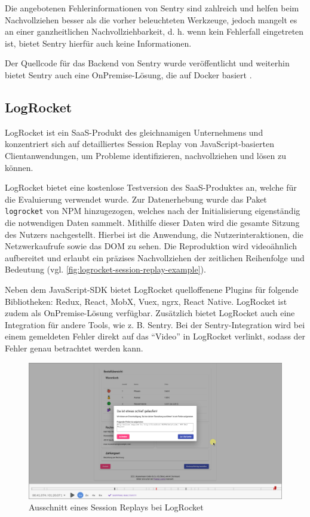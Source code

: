 Die angebotenen Fehlerinformationen von Sentry sind zahlreich und helfen beim Nachvollziehen besser als die vorher beleuchteten Werkzeuge, jedoch mangelt es an einer ganzheitlichen Nachvollziehbarkeit, d. h. wenn kein Fehlerfall eingetreten ist, bietet Sentry hierfür auch keine Informationen.

Der Quellcode für das Backend von Sentry wurde veröffentlicht und weiterhin bietet Sentry auch eine OnPremise-Lösung, die auf Docker basiert \cite{SentrySelfHosted}.

\subsection{LogRocket}

LogRocket \cite{LogRocket} ist ein SaaS-Produkt des gleichnamigen Unternehmens und konzentriert sich auf detailliertes Session Replay von JavaScript-basierten Clientanwendungen, um Probleme identifizieren, nachvollziehen und lösen zu können.

LogRocket bietet eine kostenlose Testversion des SaaS-Produktes an, welche für die Evaluierung verwendet wurde. Zur Datenerhebung wurde das Paket \texttt{logrocket} von NPM hinzugezogen, welches nach der Initialisierung eigenständig die notwendigen Daten sammelt. Mithilfe dieser Daten wird die gesamte Sitzung des Nutzers nachgestellt. Hierbei ist die Anwendung, die Nutzerinteraktionen, die Netzwerkaufrufe sowie das DOM zu sehen. Die Reproduktion wird videoähnlich aufbereitet und erlaubt ein präzises Nachvollziehen der zeitlichen Reihenfolge und Bedeutung (vgl. \autoref{fig:logrocket-session-replay-example}).

Neben dem JavaScript-SDK bietet LogRocket quelloffenene Plugins für folgende Bibliotheken: Redux, React, MobX, Vuex, ngrx, React Native. LogRocket ist zudem als OnPremise-Lösung verfügbar. Zusätzlich bietet LogRocket auch eine Integration für andere Tools, wie z. B. Sentry. Bei der Sentry-Integration wird bei einem gemeldeten Fehler direkt auf das \enquote{Video} in LogRocket verlinkt, sodass der Fehler genau betrachtet werden kann.

\begin{figure}[H]
	\centering
	\includegraphics[width=\linewidth]{img/03_methoden/logrocket_session-replay-example-cropped.png}
	\caption{Ausschnitt eines Session Replays bei LogRocket}
	\label{fig:logrocket-session-replay-example}
\end{figure}


